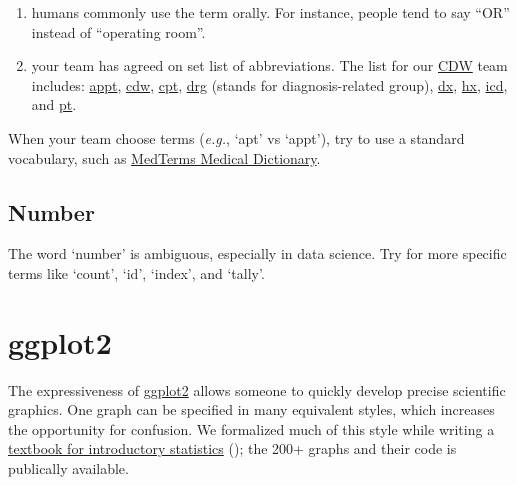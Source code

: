 \documentclass[
]{book}
\begin{document}
\begin{enumerate}
\def\labelenumi{\arabic{enumi}.}
\item
  humans commonly use the term orally. For instance, people tend to say ``OR'' instead of ``operating room''.
\item
  your team has agreed on set list of abbreviations. The list for our \href{https://github.com/OuhscBbmc/prairie-outpost-public\#readme}{CDW} team includes:
  \href{https://www.merriam-webster.com/dictionary/appointment}{appt},
  \href{https://en.wikipedia.org/wiki/Clinical_data_repository}{cdw},
  \href{https://en.wikipedia.org/wiki/Current_Procedural_Terminology}{cpt},
  \href{https://en.wikipedia.org/wiki/Diagnosis-related_group}{drg} (stands for diagnosis-related group),
  \href{https://www.medicinenet.com/script/main/art.asp?articlekey=33829}{dx},
  \href{https://medical-dictionary.thefreedictionary.com/Hx}{hx},
  \href{https://www.cdc.gov/nchs/icd/icd10cm.htm}{icd}, and
  \href{https://www.medicinenet.com/script/main/art.asp?articlekey=39154}{pt}.
\end{enumerate}

When your team choose terms (\emph{e.g.}, `apt' vs `appt'), try to use a standard vocabulary, such as \href{https://www.medicinenet.com/medterms-medical-dictionary/article.htm}{MedTerms Medical Dictionary}.

\hypertarget{style-number}{%
\subsection{Number}\label{style-number}}

The word `number' is ambiguous, especially in data science. Try for more specific terms like `count', `id', `index', and `tally'.

\hypertarget{ggplot2}{%
\section{ggplot2}\label{ggplot2}}

The expressiveness of \href{https://ggplot2.tidyverse.org/}{ggplot2} allows someone to quickly develop precise scientific graphics. One graph can be specified in many equivalent styles, which increases the opportunity for confusion. We formalized much of this style while writing a \href{https://github.com/OuhscBbmc/DeSheaToothakerIntroStats/blob/master/thumbnails/thumbnails.md}{textbook for introductory statistics} (\citet{deshea}); the 200+ graphs and their code is publically available.
\end{document}
